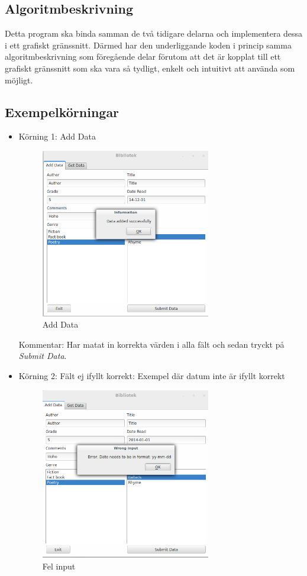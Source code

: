 \documentclass[11pt, titlepage, oneside, a4paper]{article}
\newcommand{\Subsection}[1]{\vspace{-4pt}\subsection{#1}\vspace{-8pt}}
\begin{document}
		\Subsection{Algoritmbeskrivning}
		Detta program ska binda samman de två tidigare delarna och implementera dessa i ett grafiskt gränssnitt. 
		Därmed har den underliggande koden i princip samma algoritmbeskrivning som föregående delar förutom att
		det är kopplat till ett grafiskt gränssnitt som ska vara så tydligt, enkelt och intuitivt att använda som möjligt.
		\Subsection{Exempelkörningar}
		\begin{itemize}
		 \item Körning 1: Add Data
    \subitem \begin{figure}[h]
    \centering
    \includegraphics[width=0.7\textwidth]{successAdd.png}
    \caption{Add Data}
    \label{fig:succesAdd}
\end{figure}

Kommentar: Har matat in korrekta värden i alla fält och sedan tryckt på \emph{Submit Data}.
	\newpage
	\item Körning 2: Fält ej ifyllt korrekt: Exempel där datum inte är ifyllt korrekt
    \subitem \begin{figure}[h]
    \centering
    \includegraphics[width=0.7\textwidth]{datumFail.png}
    \caption{Fel input	}
    \label{fig:Wrong input}
\end{figure}


\end{itemize}
\end{document}
